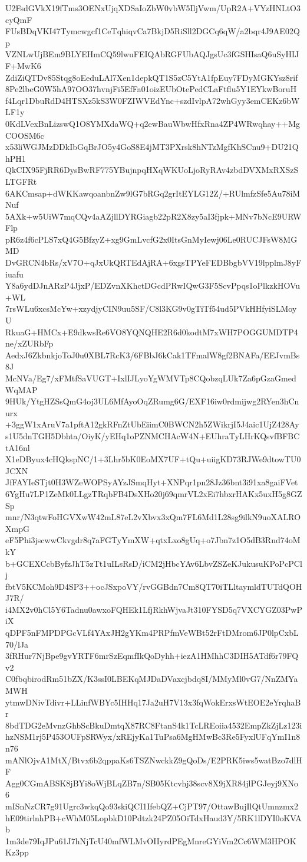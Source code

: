 U2FsdGVkX19fTms3OENxUjqXDSaIoZbW0vbW5IljVwm/UpR2A+VYzHNLtO3cyQmF
FUsBDqVKI47Tymcwgcf1CeTqhiqvCa7BkjD5RiSll2DGCq6qW/a2bqr4J9AE02Qp
VZNLwUjBEm9BLYEHmCQ59lwuFEIQAbRGFUbAQJgsUc3fGSHIsaQ6uSyHIJF+MwK6
ZdiZiQTDv85Stqg8oEeduLAl7Xen1depkQT1S5zC5YtA1fpEuy7FDyMGKYsz8rif
8Pe2lbeG0W5hA97OO37hvnjFi5EfFa01oizEUbOtePedCLaFtflu5Y1EYkwBoruH
f4Lqr1DbuRdD4HTSXz5kS3W0FZIWVEdYnc+szdIvlpA72whGyy3emCEKz6bWLF1y
0KdLVexBnLizswQ1O8YMXdaWQ+q2ewBauWbwHfxRna4ZP4WRwqhay++MgCOOSM6c
x53liWGJMzDDkIbGqBrJO5y4GoS8E4jMT3PXrsk8hNTzMgfKhSCnu9+DU21QhPH1
QkCIX95FjRR6DysBwRF775YBujnpqHXqWKUoLjoRyRAv4zbdDVXMxRXSzSLTGFRt
6AKCmsap+dWKKawqoanbnZw9lG7bRGq2grItEYLG12Z/+RUlmfzSfe5Au78iMNuf
5AXk+w5UiW7mqCQv4aAZjllDYRGiagb22pR2X8zy5aI3fjpk+MNv7bNcE9URWFlp
pR6z4f6cPLS7xQ4G5BfzyZ+xg9GmLvcfG2x0ItsGnMyIewj06Le0RUCJFsW8MGMD
DvGRCN4bRs/xV7O+qJxUkQRTEdAjRA+6xgsTPYeFEDBbgbVV19lpplmJ8yFiuafu
Y8a6ydDJnARzP4JjxP/EDZvnXKhctDGcdPRwIQwG3F5ScvPpqs1oPlkzkHOVu+WL
7rsWLu6xcsMcYw+xzydjyCIN9uu5SF/C8l3KG9v0gTiTf54ud5PVkHHfyiSLMoyU
RkuaG+HMCx+E9dkwsRe6VO8YQNQHE2R6d0kodtM7xWH7POGGUMDTP4ne/xZURbFp
AedxJ6ZkbnkjoToJ0u0XBL7RcK3/6FBbJ6kCak1TFmalW8gf2BNAFa/EEJvmBs8J
McNVa/Eg7/xFMtfSaVUGT+IxlIJLyoYgWMVTp8CQobzqLUk7Za6pGzaGmedWqMAP
9HUk/YtgHZSsQmG4oj3UL6MfAyoOqZRumg6G/EXF16iw0rdmijwg2RYen3hCnurx
+3ggW1xAruV7a1pftA12gkRFnZtUbEiimC0BWCN2h5ZWikrjI5J4aic1UjZ428Ay
s1U5dnTGH5Dbhta/OiyK/yEHq1oPZNMCHAcW4N+EUhraTyLHrKQsvfBFBCtA16nl
X1eDByux4cHQkspNC/1+3Lhr5bK0EoMX7UF+tQu+uiigKD73RJWe9dtowTU0JCXN
JfFAYIeSTjt0H3WZeWOPSyAYzJSmqHyt+XNPqr1pn28Jz36bnt3i91xa8gaiFVet
6YgHu7LP1ZeMk0LLgzTRqbFB4DsXHo20j69qmrVL2xEi7hbxrHAKx5uxH5g8GZSp
mnr/N3qtwFoHGVXwW42mL87eL2vXbvx3xQm7FL6Md1L28sg9ilkN9uoXALROXmpG
eF5Phi3jscwwCkvgdr8q7aFGTyYmXW+qtxLxo8gUq+o7Jbn7z1O5dB3Rnd74oMkY
b+GCEXCcbByfzJhT5zTt1uILsRsD/iCM2jHbcYAv6LbvZSZeKJukusuKPoPcPClj
fbtV5KCMoh9D4SP3++ocJSxpoVY/rvGGBdn7Cm8QT70iTLltaymldTUTdQOHJ7R/
i4MX2v0hCl5Y6Tadnu0awxoFQHEk1LfjRkhWjvaJt310FYSD5q7VXCYGZ03PwPiX
qDPF5nFMPDPGcVLf4YAxJH2gYKm4PRPfmVeWBt52rFtDMrom6JP0lpCxbL70/lJa
3fRHur7NjBpe9gvYRTF6mrSzEqmfIkQoDyhh+iezA1HMhhC3DIH5ATdf6r79FQv2
C0fbqbirodRm51bZX/K3ssI0LBEKqMJDaDVaxcjbdq8I/MMyMl0vG7/NnZMYaMWH
ytmwDNivTdivr+LLinfWBYc5IHHq17Ja2uH7V13x3fqWokErxsWtEOE2eYrqhaBr
8bdTDG2eMvnzGhbScBkuDmtqX87RC8FtanS4k1TcLREoiia4532EmpZkZjLz123i
hzNSM1rj5P453OUFpSRWyx/xREjyKa1TuPsa6MgHMwBc3Re5FyxlUFqYmI1n8n76
mANlOjvA1MtX/Btvx6b2qppaKs6TSZNwckkZ9gQoDs/E2PRK5iws5watBzo7dlHF
Agg0CGmABSK8jBYi8oWjBLqZB7n/SB05Ktcvhj38scv8X9jXR84jlPGJeyj9XNo6
mISnNzCR7g91Ugrc3wkqQo93skiQCI1IfebQZ+CjPT97/OttawBujIlQtUmnzmx2
hE09tirlnhPB+cWhM05LopbkD10Pdtzk24PZ05OiTdxHaud3Y/5RK1lDYI0oKVAb
1m3de79IqJPu61J7hNjTcU40mfWLMvOIIyrdPEgMnreGYiVm2Cc6WM3HPOKKz3pp
